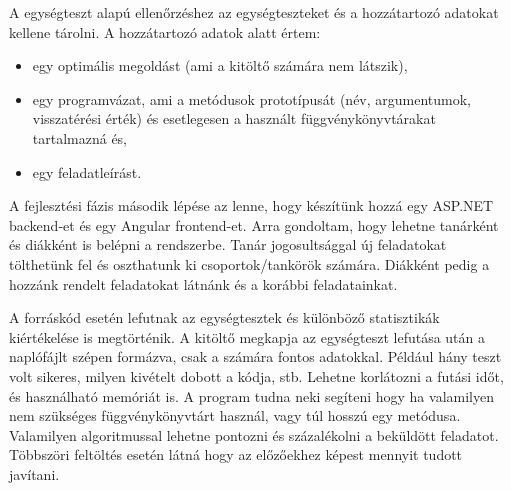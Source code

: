 \documentclass[a4paper,12pt]{article}
\begin{document}
    A egységteszt alapú ellenőrzéshez az egységteszteket és a hozzátartozó adatokat kellene tárolni. A hozzátartozó adatok alatt értem:
    \begin{itemize}
        \item egy optimális megoldást (ami a kitöltő számára nem látszik),
        \item egy programvázat, ami a metódusok prototípusát (név, argumentumok, visszatérési érték) és esetlegesen a használt függvénykönyvtárakat tartalmazná és,
        \item egy feladatleírást.
    \end{itemize}
    A fejlesztési fázis második lépése az lenne, hogy készítünk hozzá egy ASP.NET backend-et és egy Angular frontend-et. Arra gondoltam, hogy lehetne tanárként és diákként is belépni a rendszerbe. Tanár jogosultsággal új feladatokat tölthetünk fel és oszthatunk ki csoportok/tankörök számára. Diákként pedig a hozzánk rendelt feladatokat látnánk és a korábbi feladatainkat.

    A forráskód esetén lefutnak az egységtesztek és különböző statisztikák kiértékelése is megtörténik. A kitöltő megkapja az egységteszt lefutása után a naplófájlt szépen formázva, csak a számára fontos adatokkal. Például hány teszt volt sikeres, milyen kivételt dobott a kódja, stb. Lehetne korlátozni a futási időt, és használható memóriát is. A program tudna neki segíteni hogy ha valamilyen nem szükséges függvénykönyvtárt használ, vagy túl hosszú egy metódusa. Valamilyen algoritmussal lehetne pontozni és százalékolni a beküldött feladatot. Többszöri feltöltés esetén látná hogy az előzőekhez képest mennyit tudott javítani.
\end{document}
